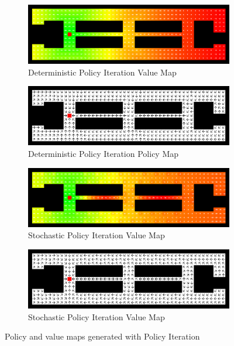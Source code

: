 \documentclass{article}
\begin{document}
\begin{figure}
    \begin{subfigure}{.5\textwidth}
        \centering
        \includegraphics[width=.8\linewidth]{imgs/policy_iteration_value_map_deterministic.png}
        \caption{Deterministic Policy Iteration Value Map}
    \end{subfigure}
    \begin{subfigure}{.5\textwidth}
        \centering
        \includegraphics[width=.8\linewidth]{imgs/polciy_iteration_policy_map_deterministic.png}
        \caption{Deterministic Policy Iteration Policy Map}
    \end{subfigure}
    \begin{subfigure}{.5\textwidth}
        \centering
        \includegraphics[width=.8\linewidth]{imgs/policy_iteration_value_map_stochastic.png}
        \caption{Stochastic Policy Iteration Value Map}
    \end{subfigure}
    \begin{subfigure}{.5\textwidth}
        \centering
        \includegraphics[width=.8\linewidth]{imgs/polciy_iteration_policy_map_stochastic.png}
        \caption{Stochastic Policy Iteration Value Map}
    \end{subfigure}
    \caption{Policy and value maps generated with Policy Iteration}
\end{figure}
\end{document}
